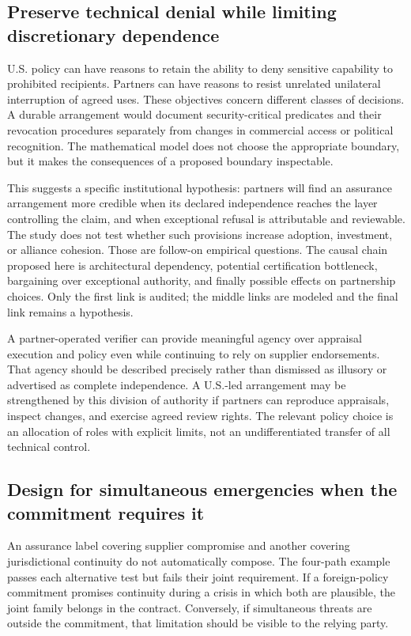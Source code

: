 \documentclass[11pt,letterpaper]{article}
\begin{document}
\subsection{Preserve technical denial while limiting discretionary dependence}
U.S. policy can have reasons to retain the ability to deny sensitive capability to prohibited recipients. Partners can have reasons to resist unrelated unilateral interruption of agreed uses. These objectives concern different classes of decisions. A durable arrangement would document security-critical predicates and their revocation procedures separately from changes in commercial access or political recognition. The mathematical model does not choose the appropriate boundary, but it makes the consequences of a proposed boundary inspectable.

This suggests a specific institutional hypothesis: partners will find an assurance arrangement more credible when its declared independence reaches the layer controlling the claim, and when exceptional refusal is attributable and reviewable. The study does not test whether such provisions increase adoption, investment, or alliance cohesion. Those are follow-on empirical questions. The causal chain proposed here is architectural dependency, potential certification bottleneck, bargaining over exceptional authority, and finally possible effects on partnership choices. Only the first link is audited; the middle links are modeled and the final link remains a hypothesis.

A partner-operated verifier can provide meaningful agency over appraisal execution and policy even while continuing to rely on supplier endorsements. That agency should be described precisely rather than dismissed as illusory or advertised as complete independence. A U.S.-led arrangement may be strengthened by this division of authority if partners can reproduce appraisals, inspect changes, and exercise agreed review rights. The relevant policy choice is an allocation of roles with explicit limits, not an undifferentiated transfer of all technical control.

\subsection{Design for simultaneous emergencies when the commitment requires it}
An assurance label covering supplier compromise and another covering jurisdictional continuity do not automatically compose. The four-path example passes each alternative test but fails their joint requirement. If a foreign-policy commitment promises continuity during a crisis in which both are plausible, the joint family belongs in the contract. Conversely, if simultaneous threats are outside the commitment, that limitation should be visible to the relying party.
\end{document}
